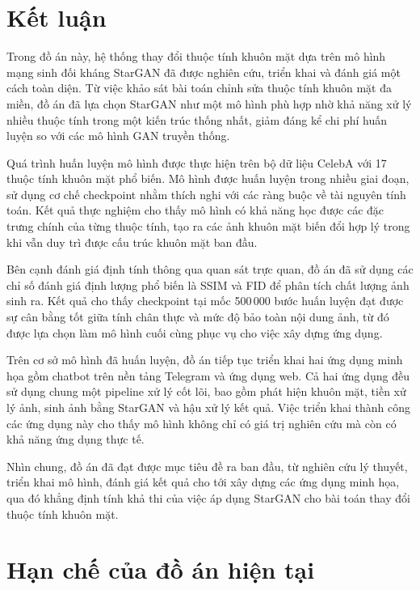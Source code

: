 \documentclass[../DoAn.tex]{subfiles}
\begin{document}
\section{Kết luận}
\label{section:7.1}

Trong đồ án này, hệ thống thay đổi thuộc tính khuôn mặt dựa trên mô hình mạng sinh đối kháng StarGAN đã được nghiên cứu, triển khai và đánh giá một cách toàn diện. Từ việc khảo sát bài toán chỉnh sửa thuộc tính khuôn mặt đa miền, đồ án đã lựa chọn StarGAN như một mô hình phù hợp nhờ khả năng xử lý nhiều thuộc tính trong một kiến trúc thống nhất, giảm đáng kể chi phí huấn luyện so với các mô hình GAN truyền thống.

Quá trình huấn luyện mô hình được thực hiện trên bộ dữ liệu CelebA với 17 thuộc tính khuôn mặt phổ biến. Mô hình được huấn luyện trong nhiều giai đoạn, sử dụng cơ chế checkpoint nhằm thích nghi với các ràng buộc về tài nguyên tính toán. Kết quả thực nghiệm cho thấy mô hình có khả năng học được các đặc trưng chính của từng thuộc tính, tạo ra các ảnh khuôn mặt biến đổi hợp lý trong khi vẫn duy trì được cấu trúc khuôn mặt ban đầu.

Bên cạnh đánh giá định tính thông qua quan sát trực quan, đồ án đã sử dụng các chỉ số đánh giá định lượng phổ biến là SSIM và FID để phân tích chất lượng ảnh sinh ra. Kết quả cho thấy checkpoint tại mốc 500\,000 bước huấn luyện đạt được sự cân bằng tốt giữa tính chân thực và mức độ bảo toàn nội dung ảnh, từ đó được lựa chọn làm mô hình cuối cùng phục vụ cho việc xây dựng ứng dụng.

Trên cơ sở mô hình đã huấn luyện, đồ án tiếp tục triển khai hai ứng dụng minh họa gồm chatbot trên nền tảng Telegram và ứng dụng web. Cả hai ứng dụng đều sử dụng chung một pipeline xử lý cốt lõi, bao gồm phát hiện khuôn mặt, tiền xử lý ảnh, sinh ảnh bằng StarGAN và hậu xử lý kết quả. Việc triển khai thành công các ứng dụng này cho thấy mô hình không chỉ có giá trị nghiên cứu mà còn có khả năng ứng dụng thực tế.

Nhìn chung, đồ án đã đạt được mục tiêu đề ra ban đầu, từ nghiên cứu lý thuyết, triển khai mô hình, đánh giá kết quả cho tới xây dựng các ứng dụng minh họa, qua đó khẳng định tính khả thi của việc áp dụng StarGAN cho bài toán thay đổi thuộc tính khuôn mặt.

\section{Hạn chế của đồ án hiện tại}
\label{section:7.2}
\end{document}

